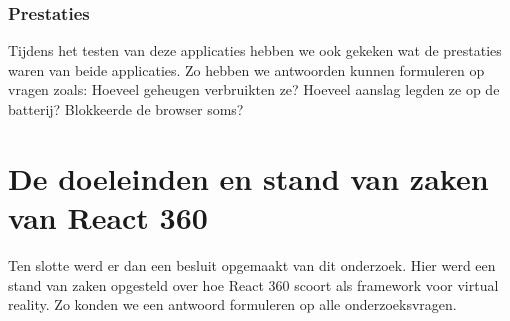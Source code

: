 \subsubsection{Prestaties}
Tijdens het testen van deze applicaties hebben we ook gekeken wat de prestaties waren van beide applicaties. Zo hebben we antwoorden kunnen formuleren op vragen zoals: Hoeveel geheugen verbruikten ze? Hoeveel aanslag legden ze op de batterij? Blokkeerde de browser soms?

\section{De doeleinden en stand van zaken van React 360}
\label{sec:doeleinden-reactvr}
Ten slotte werd er dan een besluit opgemaakt van dit onderzoek. Hier werd een stand van zaken opgesteld over hoe React 360 scoort als framework voor virtual reality. Zo konden we een antwoord formuleren op alle onderzoeksvragen.



